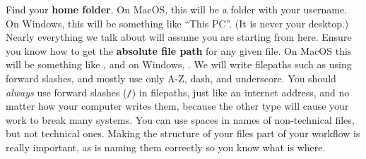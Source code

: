 
Find your \textbf{home folder}. On MacOS, this will be a folder with your username.
On Windows, this will be something like ``This PC''. (It is never your desktop.)
Nearly everything we talk about will assume you are starting from here.
Ensure you know how to get the \textbf{absolute file path} for any given file.
On MacOS this will be something like ,
and on Windows, .
We will write filepaths such as 
using forward slashes, and mostly use only A-Z, dash, and underscore.
You should \textit{always} use forward slashes (\texttt{/}) in filepaths,
just like an internet address, and no matter how your computer writes them,
because the other type will cause your work to break many systems.
You can use spaces in names of non-technical files, but not technical ones.
Making the structure of your files part of your workflow is really important,
as is naming them correctly so you know what is where.


